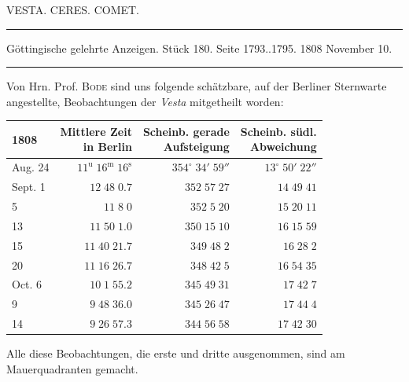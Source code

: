 \clearpage
{}
\begin{center}
VESTA. CERES. COMET.
\end{center}

\par\vspace{4pt}\hrule\vspace{4pt}
\begin{center}
\fontsize{10}{12}\selectfont Göttingische gelehrte Anzeigen. Stück 180. Seite 1793..1795. 1808 November 10.
\end{center}
\par\vspace{4pt}\hrule\vspace{4pt}

Von Hrn. Prof. \textsc{Bode} sind uns folgende schätzbare, auf der Berliner Sternwarte angestellte, Beobachtungen der \emph{Vesta} mitgetheilt worden:


\begin{center}\fontsize{10}{12}\selectfont\setlength{\tabcolsep}{5pt}\renewcommand{\arraystretch}{1.15}\begin{tabular}{lrrr}
1808 & \shortstack{Mittlere Zeit\\in Berlin} & \shortstack{Scheinb. gerade\\Aufsteigung} & \shortstack{Scheinb. südl.\\Abweichung}\\
\hline
Aug. 24 & $11^{\text{u}}\;16^{\text{m}}\;16^{\text{s}}$ & $354^\circ\;34'\;59''$ & $13^\circ\;50'\;22''$\\
Sept. 1 & $12\;48\;0.7$ & $352\;57\;27$ & $14\;49\;41$\\
5 & $11\;8\;0$ & $352\;5\;20$ & $15\;20\;11$\\
13 & $11\;50\;1.0$ & $350\;15\;10$ & $16\;15\;59$\\
15 & $11\;40\;21.7$ & $349\;48\;2$ & $16\;28\;2$\\
20 & $11\;16\;26.7$ & $348\;42\;5$ & $16\;54\;35$\\
Oct. 6 & $10\;1\;55.2$ & $345\;49\;31$ & $17\;42\;7$\\
9 & $9\;48\;36.0$ & $345\;26\;47$ & $17\;44\;4$\\
14 & $9\;26\;57.3$ & $344\;56\;58$ & $17\;42\;30$\\
\end{tabular}\end{center}


\par\indent Alle diese Beobachtungen, die erste und dritte ausgenommen, sind am Mauerquadranten gemacht.

